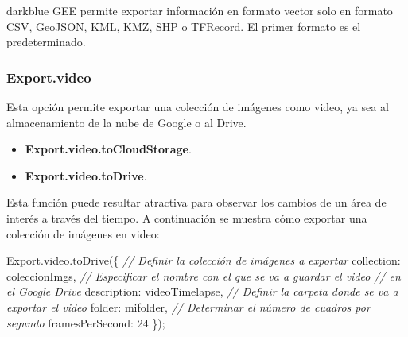 \documentclass[
  12pt,
  letterpaper,
  twoside]{book}
\newenvironment{Shaded}{\begin{snugshade}}{\end{snugshade}}
\newcommand{\AttributeTok}[1]{\textcolor[rgb]{0.48,0.12,0.64}{#1}}
\newcommand{\CommentTok}[1]{\textcolor[rgb]{0.24,0.58,0.00}{\textit{#1}}}
\newcommand{\DataTypeTok}[1]{\textcolor[rgb]{0.00,0.00,0.00}{#1}}
\newcommand{\DecValTok}[1]{\textcolor[rgb]{0.28,0.53,0.93}{#1}}
\newcommand{\FunctionTok}[1]{\textcolor[rgb]{0.48,0.12,0.64}{#1}}
\newcommand{\NormalTok}[1]{#1}
\newcommand{\OperatorTok}[1]{\textcolor[rgb]{0.00,0.00,0.00}{#1}}
\newcommand{\StringTok}[1]{\textcolor[rgb]{0.87,0.29,0.22}{#1}}
\providecommand{\tightlist}{%
  \setlength{\itemsep}{0pt}\setlength{\parskip}{0pt}}
\newcommand\boldpurple[1]{\textcolor{darkpurple}{\textbf{#1}}}
\begin{document}
\begin{bluebox2}

\begin{awesomeblock}{5pt}{\faLightbulb}{darkblue}
GEE permite exportar información en formato vector solo en formato CSV, GeoJSON, KML, KMZ, SHP o TFRecord. El primer formato es el predeterminado.

\end{awesomeblock}

\end{bluebox2}

\hypertarget{export.video}{%
\subsubsection*{Export.video}\label{export.video}}

Esta opción permite exportar una colección de imágenes como video, ya sea al almacenamiento de la nube de Google o al Drive.

\begin{itemize}
\tightlist
\item
  \boldpurple{Export.video.toCloudStorage}.
\item
  \boldpurple{Export.video.toDrive}.
\end{itemize}

Esta función puede resultar atractiva para observar los cambios de un área de interés a través del tiempo. A continuación se muestra cómo exportar una colección de imágenes en video:

\begin{Shaded}
\begin{Highlighting}[]
\NormalTok{Export}\OperatorTok{.}\AttributeTok{video}\OperatorTok{.}\FunctionTok{toDrive}\NormalTok{(\{}
  \CommentTok{// Definir la colección de imágenes a exportar}
  \DataTypeTok{collection}\OperatorTok{:}\NormalTok{ coleccionImgs}\OperatorTok{,}
  \CommentTok{// Especificar el nombre con el que se va a guardar el video}
  \CommentTok{// en el Google Drive}
  \DataTypeTok{description}\OperatorTok{:} \StringTok{\textquotesingle{}videoTimelapse\textquotesingle{}}\OperatorTok{,}
  \CommentTok{// Definir la carpeta donde se va a exportar el video}
  \DataTypeTok{folder}\OperatorTok{:} \StringTok{\textquotesingle{}mifolder\textquotesingle{}}\OperatorTok{,}
  \CommentTok{// Determinar el número de cuadros por segundo}
  \DataTypeTok{framesPerSecond}\OperatorTok{:} \DecValTok{24}
\NormalTok{ \})}\OperatorTok{;}
\end{Highlighting}
\end{Shaded}
\end{document}

